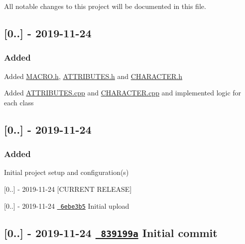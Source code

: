 All notable changes to this project will be documented in this file.

\subsection*{\mbox{[}0..\mbox{]} -\/ 2019-\/11-\/24}

\subsubsection*{Added}


\begin{DoxyItemize}
\item Added \mbox{\hyperlink{_m_a_c_r_o_8h}{M\+A\+C\+R\+O.\+h}}, \mbox{\hyperlink{_a_t_t_r_i_b_u_t_e_s_8h}{A\+T\+T\+R\+I\+B\+U\+T\+E\+S.\+h}} and \mbox{\hyperlink{_c_h_a_r_a_c_t_e_r_8h}{C\+H\+A\+R\+A\+C\+T\+E\+R.\+h}}
\item Added \mbox{\hyperlink{_a_t_t_r_i_b_u_t_e_s_8cpp}{A\+T\+T\+R\+I\+B\+U\+T\+E\+S.\+cpp}} and \mbox{\hyperlink{_c_h_a_r_a_c_t_e_r_8cpp}{C\+H\+A\+R\+A\+C\+T\+E\+R.\+cpp}} and implemented logic for each class
\end{DoxyItemize}

\subsection*{\mbox{[}0..\mbox{]} -\/ 2019-\/11-\/24}

\subsubsection*{Added}


\begin{DoxyItemize}
\item Initial project setup and configuration(s)
\end{DoxyItemize}



 \mbox{[}0..\mbox{]} -\/ 2019-\/11-\/24 \mbox{[}C\+U\+R\+R\+E\+NT R\+E\+L\+E\+A\+SE\mbox{]}

\mbox{[}0..\mbox{]} -\/ 2019-\/11-\/24 \href{https://github.com/Justin-Byrne/Player/commit/6ebe3b52f2a695698ca2a80ea563aece3c2c7302}{\texttt{ 6ebe3b5}} Initial upload

\subsection*{\mbox{[}0..\mbox{]} -\/ 2019-\/11-\/24 \href{https://github.com/Justin-Byrne/Player/commit/839199aeea37eeae2b59b27c044be357f9f8f508}{\texttt{ 839199a}} Initial commit }

